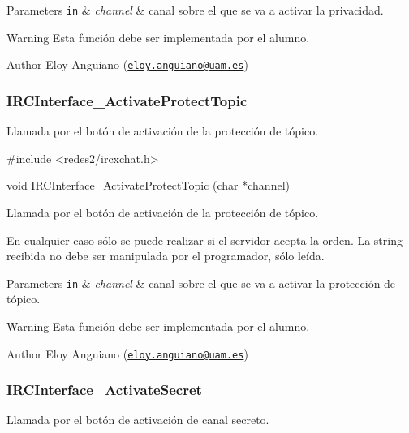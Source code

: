 \begin{DoxyParams}[1]{Parameters}
\mbox{\tt in}  & {\em channel} & canal sobre el que se va a activar la privacidad.\\
\hline
\end{DoxyParams}
\begin{DoxyWarning}{Warning}
Esta función debe ser implementada por el alumno.
\end{DoxyWarning}
\begin{DoxyAuthor}{Author}
Eloy Anguiano (\href{mailto:eloy.anguiano@uam.es}{\tt eloy.\+anguiano@uam.\+es})
\end{DoxyAuthor}


 \hypertarget{IRCInterface_ActivateProtectTopic}{}\subsubsection{I\+R\+C\+Interface\+\_\+\+Activate\+Protect\+Topic}\label{IRCInterface_ActivateProtectTopic}
Llamada por el botón de activación de la protección de tópico.


\begin{DoxyCode}
\textcolor{preprocessor}{#include <redes2/ircxchat.h>}

\textcolor{keywordtype}{void} IRCInterface\_ActivateProtectTopic (\textcolor{keywordtype}{char} *channel)
\end{DoxyCode}


Llamada por el botón de activación de la protección de tópico.

En cualquier caso sólo se puede realizar si el servidor acepta la orden. La string recibida no debe ser manipulada por el programador, sólo leída.


\begin{DoxyParams}[1]{Parameters}
\mbox{\tt in}  & {\em channel} & canal sobre el que se va a activar la protección de tópico.\\
\hline
\end{DoxyParams}
\begin{DoxyWarning}{Warning}
Esta función debe ser implementada por el alumno.
\end{DoxyWarning}
\begin{DoxyAuthor}{Author}
Eloy Anguiano (\href{mailto:eloy.anguiano@uam.es}{\tt eloy.\+anguiano@uam.\+es})
\end{DoxyAuthor}


 \hypertarget{IRCInterface_ActivateSecret}{}\subsubsection{I\+R\+C\+Interface\+\_\+\+Activate\+Secret}\label{IRCInterface_ActivateSecret}
Llamada por el botón de activación de canal secreto.


